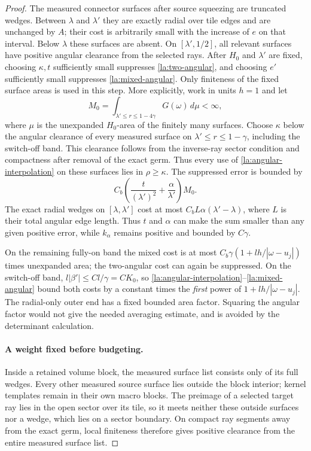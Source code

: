 \documentclass[11pt]{article}
\numberwithin{equation}{section}
\theoremstyle{definition}
\theoremstyle{remark}
\begin{document}
\begin{proof}
The measured connector surfaces after source squeezing are truncated
wedges.  Between $\lambda$ and $\lambda'$ they are exactly radial
over tile edges and are unchanged by $A$; their cost is arbitrarily
small with the increase of $e$ on that interval.  Below $\lambda$
these surfaces are absent.  On $[\lambda',1/2]$, all relevant
surfaces have positive angular clearance from the selected rays.
After $H_0$ and $\lambda'$ are fixed, choosing $\kappa,t$ sufficiently
small suppresses \eqref{la:two-angular}, and choosing $e'$ sufficiently
small suppresses \eqref{la:mixed-angular}.  Only finiteness of the
fixed surface areas is used in this step.  More explicitly, work in
units $h=1$ and let
\[
 M_0=\int_{\lambda'\le r\le1-4\gamma}G(\omega)\,d\mu<\infty,
\]
where $\mu$ is the unexpanded $H_0$-area of the finitely many surfaces.
Choose $\kappa$ below the angular clearance of every measured
surface on $\lambda'\le r\le1-\gamma$, including the switch-off
band.  This clearance follows from the inverse-ray sector condition
and compactness after removal of the exact germ.  Thus every use of
\eqref{la:angular-interpolation} on these surfaces lies in
$\rho\ge\kappa$.  The suppressed error is bounded by
\[
 C_b\left(\frac{t}{(\lambda')^2}
                +\frac{\alpha}{\lambda'}\right)M_0.
\]
The exact radial wedges on $[\lambda,\lambda']$ cost at most
$C_b L\alpha(\lambda'-\lambda)$, where $L$ is their total angular
edge length.  Thus $t$ and $\alpha$ can make the sum smaller than any
given positive error, while $k_\alpha$ remains positive and bounded
by $C\gamma$.

On the remaining fully-on band the mixed cost is at most
$C_b\gamma(1+lh/|\omega-u_j|)$ times unexpanded area; the
two-angular cost can again be suppressed.  On the switch-off band,
$l|\beta'|\le C l/\gamma=CK_0$, so
\eqref{la:angular-interpolation}--\eqref{la:mixed-angular} bound both
costs by a constant times the \emph{first} power of
$1+lh/|\omega-u_j|$.  The radial-only outer end has a fixed bounded
area factor.  Squaring the angular factor would not give the needed
averaging estimate, and is avoided by the determinant calculation.

\paragraph{A weight fixed before budgeting.}
Inside a retained volume block, the measured surface list consists
only of its full wedges.  Every other measured source surface lies
outside the block interior; kernel templates remain in their own
macro blocks.  The preimage of a selected target ray lies in the
open sector over its tile, so it meets neither these outside
surfaces nor a wedge, which lies on a sector boundary.  On compact
ray segments away from the exact germ, local finiteness therefore
gives positive clearance from the entire measured surface list.


\end{proof}
\end{document}
